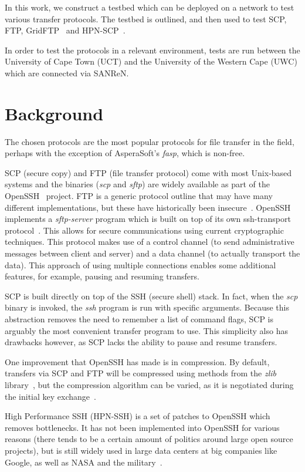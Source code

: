 \documentclass{sig-alternate-05-2015}
\begin{document}
In this work, we construct a testbed which can be deployed on a network to test various transfer protocols. The testbed is outlined, and then used to test SCP, FTP, GridFTP~\cite{allcock2005globus} and HPN-SCP~\cite{rapier2008high}. 

In order to test the protocols in a relevant environment, tests are run between the University of Cape Town (UCT) and the University of the Western Cape (UWC) which are connected via SANReN.

\section{Background}
The chosen protocols are the most popular protocols for file transfer in the field, perhaps with the exception of AsperaSoft's \textit{fasp}, which is non-free.

SCP (secure copy) and FTP (file transfer protocol) come with most Unix-based systems and the binaries (\textit{scp} and \textit{sftp}) are widely available as part of the OpenSSH~\cite{openssh} project. FTP is a generic protocol outline that may have many different implementations, but these have historically been insecure~\cite{bonachea2001safetp}. OpenSSH implements a \textit{sftp-server} program which is built on top of its own ssh-transport protocol~\cite{venkatachalam2007openssh}. This allows for secure communications using current cryptographic techniques. This protocol makes use of a control channel (to send administrative messages between client and server) and a data channel (to actually transport the data). This approach of using multiple connections enables some additional features, for example, pausing and resuming transfers.

SCP is built directly on top of the SSH (secure shell) stack. In fact, when the \textit{scp} binary is invoked, the \textit{ssh} program is run with specific arguments. Because this abstraction removes the need to remember a list of command flags, SCP is arguably the most convenient transfer program to use. This simplicity also has drawbacks however, as SCP lacks the ability to pause and resume transfers.

One improvement that OpenSSH has made is in compression. By default, transfers via SCP and FTP will be compressed using methods from the \textit{zlib} library~\cite{gailly2004zlib}, but the compression algorithm can be varied, as it is negotiated during the initial key exchange~\cite{miller2007security}.

High Performance SSH (HPN-SSH) is a set of patches to OpenSSH which removes bottlenecks. It has not been implemented into OpenSSH for various reasons (there tends to be a certain amount of politics around large open source projects), but is still widely used in large data centers at big companies like Google, as well as NASA and the military~\cite{rapierpolitics}.
\end{document}
